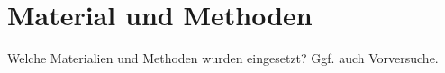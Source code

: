	\section{Material und Methoden}
	Welche Materialien und Methoden wurden eingesetzt? Ggf. auch Vorversuche.
	
